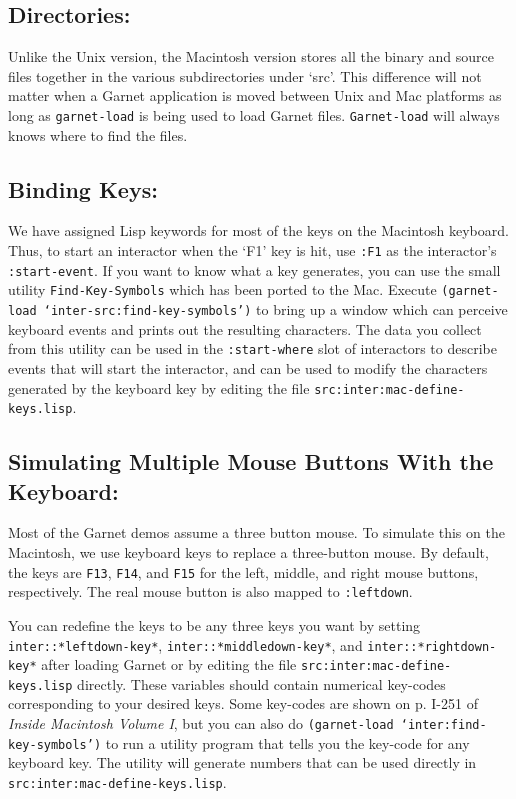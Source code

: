 \documentclass{report}
\begin{document}
\subsection{Directories:}
Unlike the Unix version, the Macintosh version stores all the binary
and source files together in the various subdirectories under `src'.
This difference will not matter when a Garnet application is moved
between Unix and Mac platforms as long as \texttt{garnet-load} is being
used to load Garnet files.  \texttt{Garnet-load} will always knows where
to find the files.

\subsection{Binding Keys:}
We have assigned Lisp keywords for most of the keys on the Macintosh
keyboard.  Thus, to start an interactor when the `F1' key is hit, use
\texttt{:F1} as the interactor's \texttt{:start-event}.  If you want to know
what a key generates, you can use the small utility
\texttt{Find-Key-Symbols} which has been ported to the Mac.  Execute
\texttt{(garnet-load `inter-src:find-key-symbols')} to bring
up a window which can perceive keyboard events and prints out the
resulting characters.  The data you collect from this utility can be
used in the \texttt{:start-where} slot of interactors to describe events
that will start the interactor, and can be used to modify the
characters generated by the keyboard key by editing the file
\texttt{src:inter:mac-define-keys.lisp}.

\subsection{Simulating Multiple Mouse Buttons With the Keyboard:}
Most of the Garnet demos assume a three button mouse.  To simulate
this on the Macintosh, we use keyboard keys to replace a three-button
mouse.  By default, the keys are \texttt{F13}, \texttt{F14}, and \texttt{F15} for
the left, middle, and right mouse buttons, respectively.  The real
mouse button is also mapped to \texttt{:leftdown}.

You can redefine the keys to be any three keys you want by setting
\texttt{inter::*leftdown-key*}, \texttt{inter::*middledown-key*}, and
\texttt{inter::*rightdown-key*} after loading Garnet or by editing the
file \texttt{src:inter:mac-define-keys.lisp} directly.  These variables
should contain numerical key-codes corresponding to your desired keys.
Some key-codes are shown on p. I-251 of {\it Inside Macintosh Volume
  I}, but you can also do \texttt{(garnet-load `inter:find-key-symbols')}
to run a utility program that tells you the key-code for any keyboard
key.  The utility will generate numbers that can be used directly in
\texttt{src:inter:mac-define-keys.lisp}.
\end{document}
